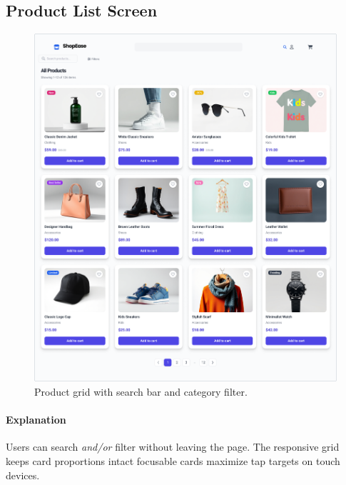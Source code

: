 \documentclass[12pt]{article}
\begin{document}

	\subsection{Product List Screen}\label{subsec:product-list-screen}

	\begin{figure}[H]
		\centering
		\includegraphics[width=\linewidth]{pictures/main/Product_List_Figma}%
		\caption{Product grid with search bar and category filter.}
		\label{fig:ui-products}
	\end{figure}

	\paragraph{Explanation}%
	Users can search \emph{and/or} filter without leaving the page.
	The responsive grid keeps card proportions intact focusable
	cards maximize tap targets on touch devices.
\end{document}
